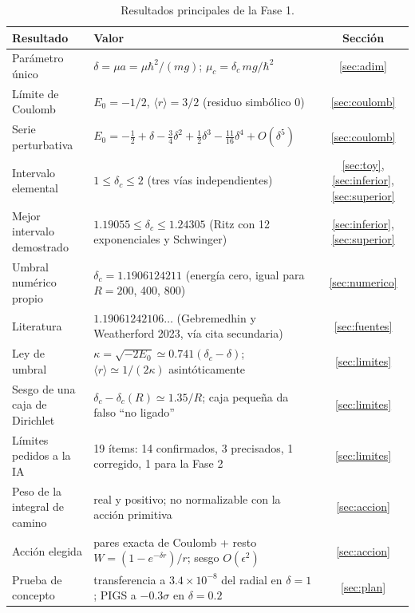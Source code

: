 \documentclass[11pt]{article}
\newcommand{\dc}{\delta_c}
\begin{document}
\begin{table}[H]
\centering
\small
\caption{Resultados principales de la Fase 1.}
\label{tab:resumen}
\begin{tabular}{@{}L{5.2cm}L{8.3cm}c@{}}
\toprule
\textbf{Resultado} & \textbf{Valor} & \textbf{Sección}\\
\midrule
Parámetro único & $\delta=\mu a=\mu\hbar^2/(mg)$; $\mu_c=\dc\,mg/\hbar^2$ & \ref{sec:adim}\\
Límite de Coulomb & $E_0=-1/2$, $\langle r\rangle=3/2$ (residuo simbólico 0) & \ref{sec:coulomb}\\
Serie perturbativa & $E_0=-\tfrac12+\delta-\tfrac34\delta^2+\tfrac12\delta^3-\tfrac{11}{16}\delta^4+O(\delta^5)$ & \ref{sec:coulomb}\\
Intervalo elemental & $1\le\dc\le2$ (tres vías independientes) & \ref{sec:toy}, \ref{sec:inferior}, \ref{sec:superior}\\
Mejor intervalo demostrado & $1.19055\le\dc\le1.24305$ (Ritz con 12 exponenciales y Schwinger) & \ref{sec:inferior}, \ref{sec:superior}\\
Umbral numérico propio & $\dc=1.1906124211$ (energía cero, igual para $R=200$, 400, 800) & \ref{sec:numerico}\\
Literatura & $1.19061242106\ldots$ (Gebremedhin y Weatherford 2023, vía cita secundaria) & \ref{sec:fuentes}\\
Ley de umbral & $\kappa=\sqrt{-2E_0}\simeq0.741(\dc-\delta)$; $\langle r\rangle\simeq1/(2\kappa)$ asintóticamente & \ref{sec:limites}\\
Sesgo de una caja de Dirichlet & $\dc-\dc(R)\simeq1.35/R$; caja pequeña da falso ``no ligado'' & \ref{sec:limites}\\
Límites pedidos a la IA & 19 ítems: 14 confirmados, 3 precisados, 1 corregido, 1 para la Fase 2 & \ref{sec:limites}\\
Peso de la integral de camino & real y positivo; no normalizable con la acción primitiva & \ref{sec:accion}\\
Acción elegida & pares exacta de Coulomb + resto $W=(1-e^{-\delta r})/r$; sesgo $O(\epsilon^2)$ & \ref{sec:accion}\\
Prueba de concepto & transferencia a $3.4\times10^{-8}$ del radial en $\delta=1$; PIGS a $-0.3\sigma$ en $\delta=0.2$ & \ref{sec:plan}\\
\bottomrule
\end{tabular}
\end{table}

\clearpage
\tableofcontents
\clearpage
\end{document}
